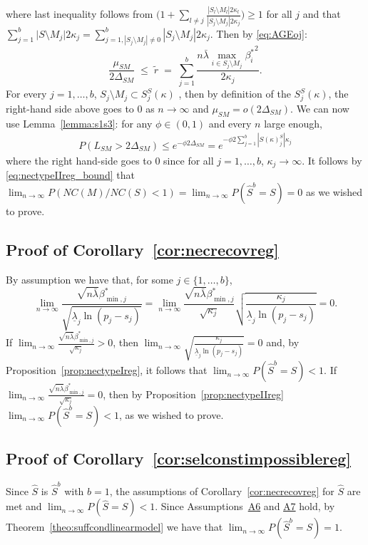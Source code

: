\documentclass[bj,authoryear]{imsart}
\theoremstyle{plain}
\begin{document}
where last inequality follows from $\Big(1+\sum_{l\neq j}\frac{|S_l\setminus M_l|2\kappa_l}{|S_j\setminus M_j|2\kappa_j}\Big)\geq 1$ for all $j$ and that $\sum_{j=1}^b \big|S\setminus M_j\big|2\kappa_j=\sum_{j=1,|S_j\setminus M_j|\neq 0 }^b|S_j\setminus M_j|2\kappa_j$. Then by \eqref{eq:AGEoj}:
$$\frac{\mu_{SM}}{2\Delta_{SM}}\;\leq \;\tilde{r}\;=\;\sum_{j=1}^b\frac{n\bar{\lambda}\max_{i\in S_j\setminus M_j}{\beta_i^*}^2}{2\kappa_j}.$$
For every $j=1,\ldots,b$, $S_j\setminus M_j \subset S_j^{S}(\kappa)$ , then by definition of the $S_j^{S}(\kappa)$, the right-hand 
side above goes to 0 as $n \to \infty$ and  $\mu_{SM}=o(2\Delta_{SM})$. We can now use Lemma~\ref{lemma:s1s3}: %
for any $\phi \in (0,1)$ and every $n$ large enough,
\begin{align}
    P(L_{SM}> 2\Delta_{SM}) \leq e^{-\phi2\Delta_{SM}} = e^{-\phi2\sum_{j=1}^b|S(\kappa)_j^S|\kappa_j}
\nonumber
\end{align} 
where the right hand-side goes to 0 since for all $j=1,\ldots,b$, $\kappa_j \to \infty$. It follows by \eqref{eq:nectypeIIreg_bound} that $\lim_{n\to\infty}P\left( NC(M)/NC(S) < 1  \right)=\lim_{n\to\infty}P(\hat S^b=S)=0$ as we wished to prove.

\subsection{Proof of Corollary~\ref{cor:necrecovreg}}
By assumption we have that, for some $j\in\{1,\ldots,b\}$, 
$$\lim_{n\to\infty}\frac{\sqrt{n\bar{\lambda}}\beta_{\min,j}^*}{\sqrt{\underline{\lambda}_j\ln(p_j-s_j)}}= \lim_{n\to\infty}\frac{\sqrt{n\bar{\lambda}}\beta_{\min,j}^*}{\sqrt{\kappa_j}}\sqrt{\frac{\kappa_j}{\underline{\lambda}_j\ln(p_j-s_j)}} = 0.$$
If $\lim_{n\to\infty}\frac{\sqrt{n\bar{\lambda}}\beta_{\min,j}^*}{\sqrt{\kappa_j}}>0$, then $\lim_{n\to\infty}\sqrt{\frac{\kappa_j}{\underline{\lambda}_j\ln(p_j-s_j)}} = 0$ and, by Proposition~\ref{prop:nectypeIreg}, it follows that $\lim_{n \to \infty} P(\hat{S}^b=S) < 1$. 
If $\lim_{n\to\infty}\frac{\sqrt{n\bar{\lambda}}\beta_{\min,j}^*}{\sqrt{\kappa_j}}=0$, then by Proposition~\ref{prop:nectypeIIreg} $\lim_{n \to \infty} P(\hat{S}^b=S) < 1$, as we wished to prove.

\subsection{Proof of Corollary~\ref{cor:selconstimpossiblereg}}
Since $\hat{S}$ is $\hat{S}^b$ with $b=1$, the assumptions of Corollary~\ref{cor:necrecovreg} for $\hat{S}$ are met and $\lim_{n \to \infty} P(\hat{S} = S) < 1$. Since Assumptions~\hyperlink{lab:A6}{A6} and \hyperlink{lab:A7}{A7} hold, by Theorem~\ref{theo:suffcondlinearmodel} we have that $\lim_{n \to \infty} P(\hat{S}^b = S)= 1$.
\end{document}
